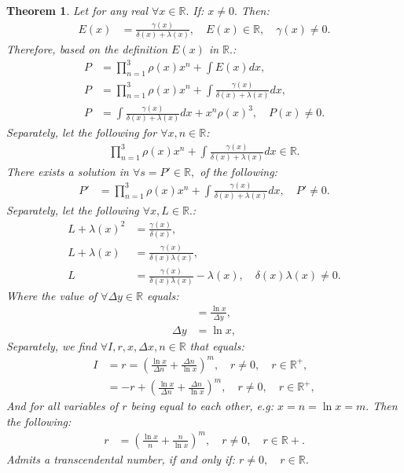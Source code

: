\documentclass[10pt]{article}
\theoremstyle{plain}
\newtheorem{theorem}{Theorem}[section]
\theoremstyle{definition}
\theoremstyle{remark}
\begin{document}
\begin{theorem}
	Let for any real $\forall x \in \mathbb{R}.$ If: $x \neq 0.$ Then:
	\begin{align*}
		E(x) &= \frac{\gamma(x)}{\delta(x) + \lambda(x)}, \quad E(x) \in \mathbb{R}, \quad \gamma(x) \neq 0.
	\end{align*}
	Therefore, based on the definition $E(x)$ in $\mathbb{R}.$:
	\begin{align*}
		P &= \prod_{n=1}^{3}\rho(x) x^{n} + \int E(x) dx,\\
		P &= \prod_{n=1}^{3}\rho(x) x^{n} + \int \frac{\gamma(x)}{\delta(x) + \lambda(x)} dx,\\
		P &= \int \frac{\gamma(x)}{\delta(x) + \lambda(x)} dx + x^{n} \rho(x)^{3}, \quad P(x) \neq 0.
	\end{align*}
	Separately, let the following for $\forall x, n \in \mathbb{R}$:
	\begin{align*}
		\prod_{n=1}^{3}\rho(x) x^{n} + \int \frac{\gamma(x)}{\delta(x) + \lambda(x)} dx \in \mathbb{R}.
	\end{align*}
	There exists a solution in $\forall s = P' \in \mathbb{R},$ of the following:
	\begin{align*}
		P' &= \prod_{n=1}^{3}\rho(x) x^{n} + \int \frac{\gamma(x)}{\delta(x) + \lambda(x)} dx, \quad P' \neq 0.
	\end{align*}
	Separately, let the following $\forall x, L \in \mathbb{R}.$:
	\begin{align*}
		L + \lambda(x)^{2} &= \frac{\gamma(x)}{\delta(x)},\\
	 	L + \lambda(x) &= \frac{\gamma(x)}{\delta(x)  \lambda(x) },\\
	 	L &= \frac{\gamma(x)}{\delta(x)  \lambda(x) } - \lambda(x), \quad \delta(x)\lambda(x) \neq 0.
	\end{align*}
	Where the value of $\forall \Delta y \in \mathbb{R}$ equals:
	\begin{align*}
		&= \frac{\ln x}{\Delta y},\\
		\Delta y &= \ln x,
	\end{align*}
	Separately, we find $\forall I, r, x, \Delta x, n \in \mathbb{R}$ that equals:
	\begin{align*}
		I &= r = ( \frac{\ln x}{\Delta n} + \frac{\Delta n}{\ln x})^m, \quad r \neq 0, \quad r \in \mathbb{R}^{+},\\
		&= - r + ( \frac{\ln x}{\Delta n} + \frac{\Delta n}{\ln x})^m, \quad r \neq 0, \quad r \in \mathbb{R}^{+},
	\end{align*}
	And for all variables of $r$ being equal to each other, e.g: $x =n = \ln x = m.$ Then the following:
	\begin{align*}
		r &= ( \frac{\ln x}{n} + \frac{n}{\ln x})^m, \quad r \neq 0, \quad r \in \mathbb{R}{+}.
	\end{align*}
	Admits a transcendental number, if and only if: $r \neq 0, \quad r \in \mathbb{R}$.
\end{theorem}
\end{document}
